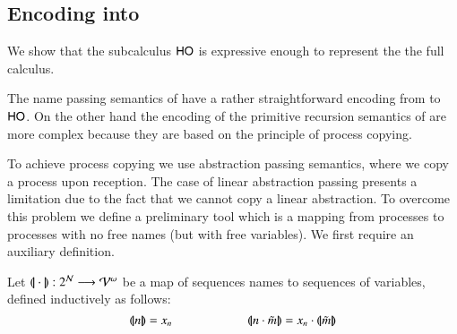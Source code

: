 
\subsection{Encoding \HOp into \HO}
\label{subsec:HOp_to_HO}


We show that the subcalculus $\mathsf{HO}$ is expressive enough to
represent the the full \HOp calculus.

The name passing semantics of \HOp have a rather straightforward
encoding from to $\mathsf{HO}$.
On the other hand the encoding of the primitive recursion semantics
of \HOp are more complex because they are based on the principle
of process copying.

To achieve process copying we use abstraction passing semantics, where
we copy a process upon reception. The case of linear abstraction passing
presents a limitation due to the fact that we cannot copy a linear abstraction.
To overcome this problem we define a preliminary tool which is a mapping from
processes to processes with no free names (but with free variables).
We first require an auxiliary definition.
%
\begin{definition}\rm 
	Let $(\!|\!|\cdot|\!|\!): 2^{\mathcal{N}} \longrightarrow \mathcal{V}^\omega$
	be a map of sequences names to sequences of variables, defined
	inductively as follows:
%
\[
	\vmap{n} = x_n \qquad \qquad \qquad \vmap{n \cat \tilde{m}} = x_n \cat \vmap{\tilde{m}}
\]
\end{definition}

